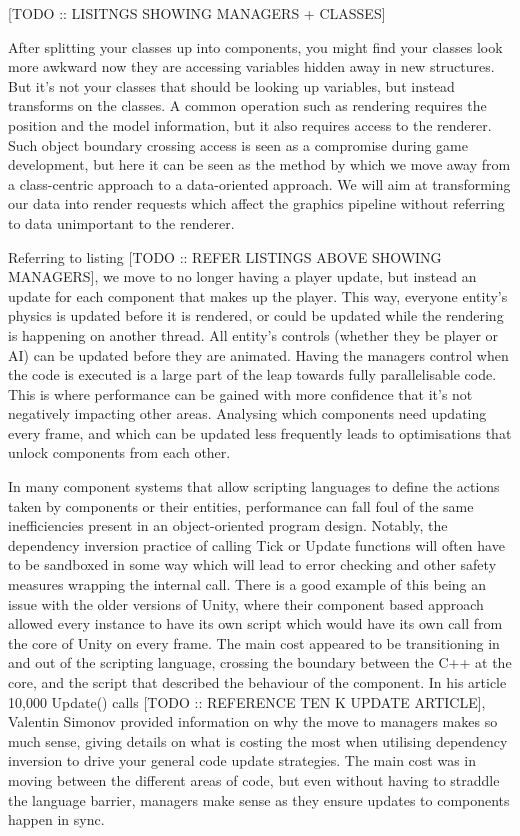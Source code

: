 \documentclass[a4paper,12pt]{article}
\begin{document}
[TODO :: LISITNGS SHOWING MANAGERS + CLASSES]

After splitting your classes up into components, you might find your classes look more awkward now they are accessing variables hidden away in new structures.
But it's not your classes that should be looking up variables, but instead transforms on the classes.
A common operation such as rendering requires the position and the model information, but it also requires access to the renderer.
Such object boundary crossing access is seen as a compromise during game development, but here it can be seen as the method by which we move away from a class-centric approach to a data-oriented approach.
We will aim at transforming our data into render requests which affect the graphics pipeline without referring to data unimportant to the renderer.

Referring to listing [TODO :: REFER LISTINGS ABOVE SHOWING MANAGERS], we move to no longer having a player update, but instead an update for each component that makes up the player.
This way, everyone entity's physics is updated before it is rendered, or could be updated while the rendering is happening on another thread.
All entity's controls (whether they be player or AI) can be updated before they are animated.
Having the managers control when the code is executed is a large part of the leap towards fully parallelisable code.
This is where performance can be gained with more confidence that it's not negatively impacting other areas.
Analysing which components need updating every frame, and which can be updated less frequently leads to optimisations that unlock components from each other.

In many component systems that allow scripting languages to define the actions taken by components or their entities, performance can fall foul of the same inefficiencies present in an object-oriented program design.
Notably, the dependency inversion practice of calling Tick or Update functions will often have to be sandboxed in some way which will lead to error checking and other safety measures wrapping the internal call.
There is a good example of this being an issue with the older versions of Unity, where their component based approach allowed every instance to have its own script which would have its own call from the core of Unity on every frame.
The main cost appeared to be transitioning in and out of the scripting language, crossing the boundary between the C++ at the core, and the script that described the behaviour of the component.
In his article 10,000 Update() calls [TODO :: REFERENCE TEN K UPDATE ARTICLE], Valentin Simonov provided information on why the move to managers makes so much sense, giving details on what is costing the most when utilising dependency inversion to drive your general code update strategies.
The main cost was in moving between the different areas of code, but even without having to straddle the language barrier, managers make sense as they ensure updates to components happen in sync.
\end{document}
